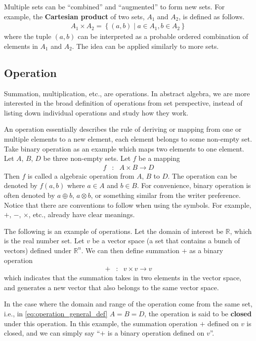 Multiple sets can be ``combined'' and ``augmented'' to form new sets. For example, the \textbf{Cartesian product} of two sets, $A_1$ and $A_2$, is defined as follows.
\begin{eqnarray}
	A_1 \times A_2 = \left\{(a,b) \middle| a \in A_1, b\in A_2\right\} \nonumber
\end{eqnarray}
where the tuple $(a,b)$ can be interpreted as a probable ordered combination of elements in $A_1$ and $A_2$. The idea can be applied similarly to more sets.

\subsection{Operation}

Summation, multiplication, etc., are operations. In abstract algebra, we are more interested in the broad definition of operations from set perspective, instead of listing down individual operations and study how they work.

An operation essentially describes the rule of deriving or mapping from one or multiple elements to a new element, each element belongs to some non-empty set. Take binary operation as an example which maps two elements to one element. Let $A$, $B$, $D$ be three non-empty sets. Let $f$ be a mapping
\begin{eqnarray}
	f &:& A \times B \rightarrow D \label{eq:operation_general_def}
\end{eqnarray}
Then $f$ is called a algebraic operation from $A$, $B$ to $D$. The operation can be denoted by $f(a,b)$ where $a\in A$ and $b\in B$. For convenience, binary operation is often denoted by $a\oplus b$, $a\otimes b$, or something similar from the writer preference. Notice that there are conventions to follow when using the symbols. For example, $+$, $-$, $\times$, etc., already have clear meanings.

The following is an example of operations. Let the domain of interest be $\mathbb{R}$, which is the real number set. Let $v$ be a vector space (a set that contains a bunch of vectors) defined under $\mathbb{R}^n$. We can then define summation $+$ as a binary operation
\begin{eqnarray}
	+ &:& v\times v \rightarrow v \nonumber
\end{eqnarray} 
which indicates that the summation takes in two elements in the vector space, and generates a new vector that also belongs to the same vector space. 

In the case where the domain and range of the operation come from the same set, i.e., in \eqref{eq:operation_general_def} $A=B=D$, the operation is said to be \textbf{closed} under this operation. In this example, the summation operation $+$ defined on $v$ is closed, and we can simply say ``$+$ is a binary operation defined on $v$''.

